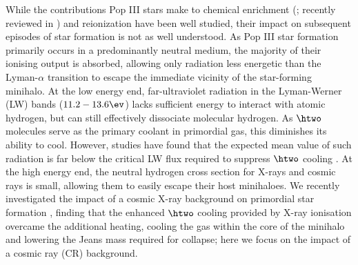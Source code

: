 While the contributions Pop III stars make to chemical enrichment (\citealt{MadauFerraraRees2001,MoriFerraraMadau2002,BrommYoshidaHernquist2003,Hegeretal2003,UmedaNomoto2003,TornatoreFerraraSchneider2007,Greifetal2007,Greifetal2010,WiseAbel2008,Maioetal2011}; recently reviewed in \citealt{KarlssonBrommHawthorn2013}) and reionization \citep{Kitayamaetal2004,Sokasianetal2004,WhalenAbelNorman2004,AlvarezBrommShapiro2006,JohnsonGreifBromm2007,Robertsonetal2010} have been well studied, their impact on subsequent episodes of star formation is not as well understood.  As Pop III star formation primarily occurs in a predominantly neutral medium, the majority of their ionising output is absorbed, allowing only radiation less energetic than the Lyman-$\alpha$ transition to escape the immediate vicinity of the star-forming minihalo.  At the low energy end, far-ultraviolet radiation in the Lyman-Werner (LW) bands ($11.2 - 13.6\ev$) lacks sufficient energy to interact with atomic hydrogen, but can still effectively dissociate molecular hydrogen.  As $\htwo$ molecules serve as the primary coolant in primordial gas, this diminishes its ability to cool.  However, studies have found that the expected mean value of such radiation is far below the critical LW flux required to suppress $\htwo$ cooling \citep{Dijkstraetal2008}. At the high energy end, the neutral hydrogen cross section for X-rays and cosmic rays is small, allowing them to easily escape their host minihaloes.  We recently investigated the impact of a cosmic X-ray background on primordial star formation \citep{Hummeletal2014}, finding that the enhanced $\htwo$ cooling provided by X-ray ionisation overcame the additional heating, cooling the gas within the core of the minihalo and lowering the Jeans mass required for collapse; here we focus on the impact of a cosmic ray (CR) background.  


